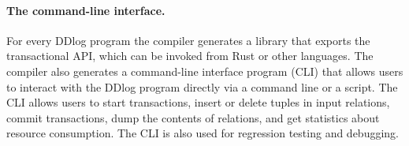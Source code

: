 \paragraph{The command-line interface.}
For every DDlog program the compiler generates a library that exports
the transactional API, which can be invoked from Rust or other
languages.  The compiler also generates a command-line interface
program (CLI) that allows users to interact with the DDlog program
directly via a command line or a script.  The CLI allows users to
start transactions, insert or delete tuples in input relations, commit
transactions, dump the contents of relations, and get statistics about
resource consumption.  The CLI is also used for regression testing and
debugging.





